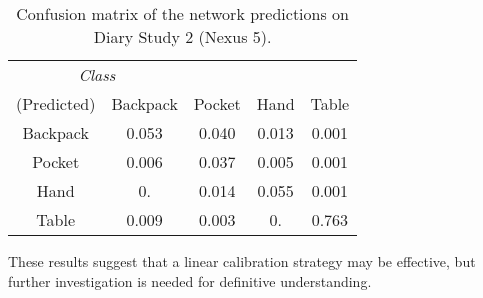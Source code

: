 \begin{table}[h]
\caption{Confusion matrix of the network predictions on Diary Study 2 (Nexus 5).}\label{fig:confusion} \centering
\begin{tabular}{| c || c | c | c | c }  
\toprule
\multicolumn{2}{c}{\textit{Class}}\multicolumn{3}{c}{(Actual)} \\ \cmidrule{1-5}
(Predicted)		&	Backpack    & 	Pocket 	& 	Hand	&	Table \\
\midrule
Backpack			&	0.053 	&	0.040	&	0.013 	&	0.001 \\
Pocket			&	0.006 	&	0.037 	&	0.005 	&	0.001 \\
Hand			&	0.	 	&	0.014 	&	0.055 	&	0.001 \\
Table			&	0.009 	&	0.003 	&	0.	 	&	0.763\\
\bottomrule
\end{tabular}
\end{table}


These results suggest that a linear calibration
strategy may be effective, but further investigation is needed for definitive understanding.

